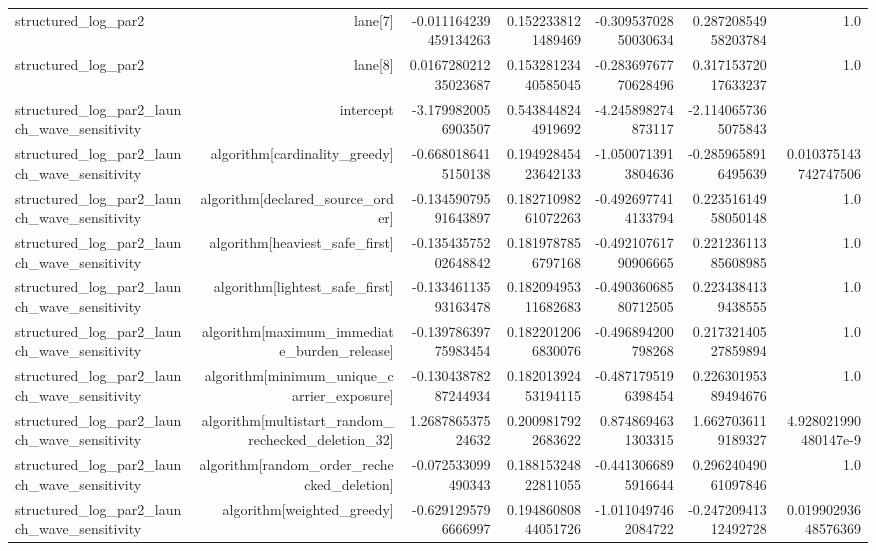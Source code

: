 {\begin{longtable}{lrrrrrr}
structured\_log\_par2 & lane[7] & -0.011164239459134263 & 0.1522338121489469 & -0.30953702850030634 & 0.28720854958203784 & 1.0 \\
structured\_log\_par2 & lane[8] & 0.016728021235023687 & 0.15328123440585045 & -0.28369767770628496 & 0.31715372017633237 & 1.0 \\
structured\_log\_par2\_launch\_wave\_sensitivity & intercept & -3.1799820056903507 & 0.5438448244919692 & -4.245898274873117 & -2.1140657365075843 &  \\
structured\_log\_par2\_launch\_wave\_sensitivity & algorithm[cardinality\_greedy] & -0.6680186415150138 & 0.19492845423642133 & -1.0500713913804636 & -0.2859658916495639 & 0.010375143742747506 \\
structured\_log\_par2\_launch\_wave\_sensitivity & algorithm[declared\_source\_order] & -0.13459079591643897 & 0.18271098261072263 & -0.4926977414133794 & 0.22351614958050148 & 1.0 \\
structured\_log\_par2\_launch\_wave\_sensitivity & algorithm[heaviest\_safe\_first] & -0.13543575202648842 & 0.1819787856797168 & -0.49210761790906665 & 0.22123611385608985 & 1.0 \\
structured\_log\_par2\_launch\_wave\_sensitivity & algorithm[lightest\_safe\_first] & -0.13346113593163478 & 0.18209495311682683 & -0.49036068580712505 & 0.2234384139438555 & 1.0 \\
structured\_log\_par2\_launch\_wave\_sensitivity & algorithm[maximum\_immediate\_burden\_release] & -0.13978639775983454 & 0.1822012066830076 & -0.496894200798268 & 0.21732140527859894 & 1.0 \\
structured\_log\_par2\_launch\_wave\_sensitivity & algorithm[minimum\_unique\_carrier\_exposure] & -0.13043878287244934 & 0.18201392453194115 & -0.4871795196398454 & 0.22630195389494676 & 1.0 \\
structured\_log\_par2\_launch\_wave\_sensitivity & algorithm[multistart\_random\_rechecked\_deletion\_32] & 1.268786537524632 & 0.2009817922683622 & 0.8748694631303315 & 1.6627036119189327 & 4.928021990480147e-9 \\
structured\_log\_par2\_launch\_wave\_sensitivity & algorithm[random\_order\_rechecked\_deletion] & -0.072533099490343 & 0.18815324822811055 & -0.4413066895916644 & 0.29624049061097846 & 1.0 \\
structured\_log\_par2\_launch\_wave\_sensitivity & algorithm[weighted\_greedy] & -0.6291295796666997 & 0.19486080844051726 & -1.0110497462084722 & -0.24720941312492728 & 0.01990293648576369 \\

\end{longtable}}
